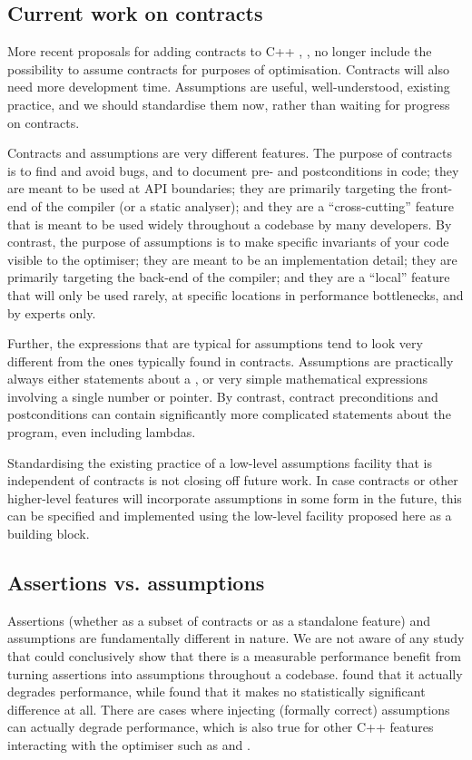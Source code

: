 \subsection{Current work on contracts}

More recent proposals for adding contracts to C++  \cite{P2388R4}, \cite{P2461R1}, \cite{P2487R0} no longer include the possibility to assume contracts for purposes of optimisation. Contracts will also need more development time. Assumptions are useful, well-understood, existing practice, and we should standardise them now, rather than waiting for progress on contracts.

Contracts and assumptions are very different features. The purpose of contracts is to find and avoid bugs, and to document pre- and postconditions in code; they are meant to be used at API boundaries; they are primarily targeting the front-end of the compiler (or a static analyser); and they are a ``cross-cutting'' feature that is meant to be used widely throughout a codebase by many developers. By contrast, the purpose of assumptions is to make specific invariants of your code visible to the optimiser; they are meant to be an implementation detail; they are primarily targeting the back-end of the compiler; and they are a ``local'' feature that will only be used rarely, at specific locations in performance bottlenecks, and by experts only.

Further, the expressions that are typical for assumptions tend to look very different from the ones typically found in contracts. Assumptions are practically always either statements about a , or very simple mathematical expressions involving a single number or pointer. By contrast, contract preconditions and postconditions can contain significantly more complicated statements about the program, even including lambdas.

Standardising the existing practice of a low-level assumptions facility that is independent of contracts is not closing off future work. In case contracts or other higher-level features will incorporate assumptions in some form in the future, this can be specified and implemented using the low-level facility proposed here as a building block.

\subsection{Assertions vs. assumptions}
\label{sec:assertions}

Assertions (whether as a subset of contracts or as a standalone feature) and assumptions are fundamentally different in nature. We are not aware of any study that could conclusively show that there is a measurable performance benefit from turning assertions into assumptions throughout a codebase. \cite{P2064R0} found that it actually degrades performance, while \cite{Amini2021} found that it makes no statistically significant difference at all. There are cases where injecting (formally correct) assumptions can actually degrade performance, which is also true for other C++ features interacting with the optimiser such as \tcode{[[likely]]} and \tcode{[[unlikely]]}.

